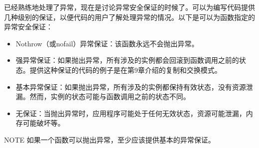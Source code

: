 已经熟练地处理了异常，现在是讨论异常安全保证的时候了。可以为编写代码提供几种级别的保证，以便代码的用户了解处理异常的情况。以下是可以为函数指定的异常安全保证：

\begin{itemize}
\item
Nothrow（或nofail）异常保证：该函数永远不会抛出异常。

\item
强异常保证：如果抛出异常，所有涉及的实例都会回滚到函数调用之前的状态。提供这种保证的代码的例子是在第9章介绍的复制和交换模式。

\item
基本异常保证：如果抛出异常，所有涉及的实例都保持有效状态，没有资源泄漏。然而，实例的状态可能与函数调用之前的状态不同。

\item
无保证：当抛出异常时，应用程序可能处于任何无效状态，资源可能泄漏，内存可能破坏等。
\end{itemize}

\begin{myNotic}{NOTE}
如果一个函数可以抛出异常，至少应该提供基本的异常保证。
\end{myNotic}